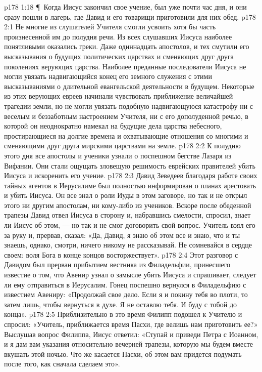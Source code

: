 \vs p178 1:18 \P\ Когда Иисус закончил свое учение, был уже почти час дня, и они сразу пошли в лагерь, где Давид и его товарищи приготовили для них обед.
\vs p178 2:1 Не многие из слушателей Учителя смогли усвоить хотя бы часть произнесенной им до полудня речи. Из всех слушавших Иисуса наиболее понятливыми оказались греки. Даже одиннадцать апостолов, и тех смутили его высказывания о будущих политических царствах и сменяющих друг друга поколениях верующих царства. Наиболее преданные последователи Иисуса не могли увязать надвигающийся конец его земного служения с этими высказываниями о длительной евангельской деятельности в будущем. Некоторые из этих верующих евреев начинали чувствовать приближение величайшей трагедии земли, но не могли увязать подобную надвигающуюся катастрофу ни с веселым и беззаботным настроением Учителя, ни с его дополуденной речью, в которой он неоднократно намекал на будущие дела царства небесного, простирающиеся на долгие времена и охватывающие отношения со многими и сменяющими друг друга мирскими царствами на земле.
\vs p178 2:2 К полудню этого дня все апостолы и ученики узнали о поспешном бегстве Лазаря из Вифании. Они стали ощущать зловещую решимость еврейских правителей убить Иисуса и искоренить его учение.
\vs p178 2:3 Давид Зеведеев благодаря работе своих тайных агентов в Иерусалиме был полностью информирован о планах арестовать и убить Иисуса. Он все знал о роли Иуды в этом заговоре, но так и не открыл этого ни другим апостолам, ни кому\hyp{}либо из учеников. Вскоре после обеденной трапезы Давид отвел Иисуса в сторону и, набравшись смелости, спросил, знает ли Иисус об этом, --- но так и не смог договорить свой вопрос. Учитель взял его за руку и, прервав, сказал: «Да, Давид, я знаю об этом все и знаю, что и ты знаешь, однако, смотри, ничего никому не рассказывай. Не сомневайся в сердце своем: воля Бога в конце концов восторжествует».
\vs p178 2:4 Этот разговор с Давидом был прерван прибытием вестника из Филадельфии, принесшего известие о том, что Авенир узнал о замысле убить Иисуса и спрашивает, следует ли ему отправиться в Иерусалим. Гонец поспешно вернулся в Филадельфию с известием Авениру: «Продолжай свое дело. Если я и покину тебя во плоти, то затем лишь, чтобы вернуться в духе. Я не оставлю тебя. И буду с тобой до конца».
\vs p178 2:5 Приблизительно в это время Филипп подошел к Учителю и спросил: «Учитель, приближается время Пасхи, где велишь нам приготовить ее?» Выслушав вопрос Филиппа, Иисус ответил: «Ступай и приведи Петра с Иоанном, и я дам вам указания относительно вечерней трапезы, которую мы будем вместе вкушать этой ночью. Что же касается Пасхи, об этом вам придется подумать после того, как сначала сделаем это».
